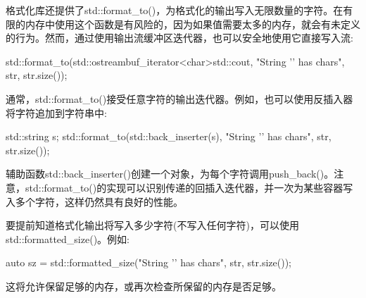 
格式化库还提供了std::format\_to()，为格式化的输出写入无限数量的字符。在有限的内存中使用这个函数是有风险的，因为如果值需要太多的内存，就会有未定义的行为。然而，通过使用输出流缓冲区迭代器，也可以安全地使用它直接写入流:

\begin{cpp}
std::format_to(std::ostreambuf_iterator<char>{std::cout},
				"String '{}' has {} chars\n", str, str.size());
\end{cpp}

通常，std::format\_to()接受任意字符的输出迭代器。例如，也可以使用反插入器将字符追加到字符串中:

\begin{cpp}
std::string s;
std::format_to(std::back_inserter(s),
				"String '{}' has {} chars\n", str, str.size());
\end{cpp}

辅助函数std::back\_inserter()创建一个对象，为每个字符调用push\_back()。注意，std::format\_to()的实现可以识别传递的回插入迭代器，并一次为某些容器写入多个字符，这样仍然具有良好的性能。


要提前知道格式化输出将写入多少字符(不写入任何字符)，可以使用std::formatted\_size()。例如:

\begin{cpp}
auto sz = std::formatted_size("String '{}' has {} chars\n", str, str.size());
\end{cpp}

这将允许保留足够的内存，或再次检查所保留的内存是否足够。






